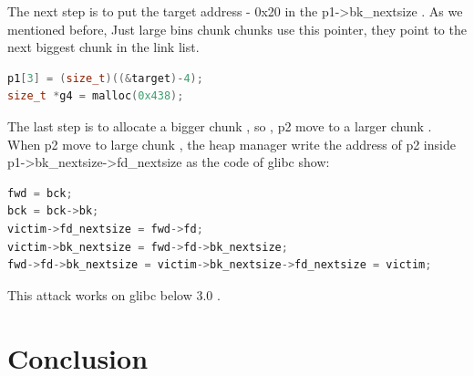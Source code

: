 \documentclass{masterthesis}
\newcommand*\libc{glibc}
\newcommand*\lb{large bins}
\begin{document}
The next step is to put the target address - 0x20 in the p1->bk\_nextsize . As we mentioned before, Just \lb{} chunk chunks use this pointer, they point to the next biggest chunk in the link list. 
\begin{lstlisting}[language=c,frame=tlrb]
p1[3] = (size_t)((&target)-4);
size_t *g4 = malloc(0x438);
\end{lstlisting}
The last step is to allocate a bigger chunk , so , p2 move to a larger chunk . When p2 move to large chunk , the heap manager write the address of p2 inside p1->bk\_nextsize->fd\_nextsize as the code of \libc{} show:
\begin{lstlisting}[language=c,frame=tlrb]
fwd = bck;
bck = bck->bk;
victim->fd_nextsize = fwd->fd;
victim->bk_nextsize = fwd->fd->bk_nextsize;
fwd->fd->bk_nextsize = victim->bk_nextsize->fd_nextsize = victim;
\end{lstlisting}
This attack works on \libc{} below 3.0 .
\chapter{Conclusion}



\end{document}

